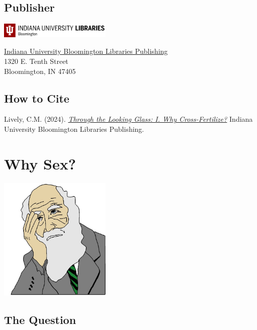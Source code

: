 \documentclass[
  letterpaper,
]{book}
\begin{document}
\section*{Publisher}\label{publisher}


\includegraphics[width=0.4\textwidth,height=\textheight]{images/libraries_lockup_WEB_h3.png}

\href{https://libraries.indiana.edu/scholarly-communication}{Indiana
University Bloomington Libraries Publishing}\\
1320 E. Tenth Street\\
Bloomington, IN 47405

\section*{How to Cite}\label{how-to-cite}


Lively, C.M. (2024).
\href{https://doi.org/10.5967/GBD3-KA07}{\emph{Through the Looking
Glass: I. Why Cross-Fertilize?}} Indiana University Bloomington
Libraries Publishing.


\chapter{Why Sex?}\label{sec-why-sex}

\begin{center}
\includegraphics[width=0.4\textwidth,height=\textheight]{images/fig1-1.jpeg}
\end{center}

\section{The Question}\label{the-question}
\end{document}
